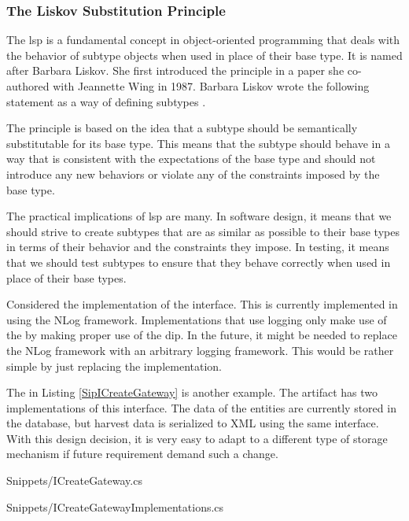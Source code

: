\subsubsection{The Liskov Substitution Principle} \label{subsubsec:lsp}


The \gls{lsp} is a fundamental concept in object-oriented programming that deals with the
behavior of subtype objects when used in place of their base type. It is named after
Barbara Liskov. She first introduced the principle in a paper she co-authored with
Jeannette Wing in 1987. Barbara Liskov wrote the following statement as a way of defining
subtypes \parencite{robert_c_martin_clean_2018}.


The principle is based on the idea that a subtype should be semantically substitutable for
its base type. This means that the subtype should behave in a way that is consistent with
the expectations of the base type and should not introduce any new behaviors or violate
any of the constraints imposed by the base type.

The practical implications of \gls{lsp} are many. In software design, it means that we
should strive to create subtypes that are as similar as possible to their base types in
terms of their behavior and the constraints they impose. In testing, it means that we
should test subtypes to ensure that they behave correctly when used in place of their base
types.

Considered the implementation of the  interface. This is
currently implemented in  using the NLog framework.
Implementations that use logging only make use of the  by making
proper use of the \acrlong{dip}. In the future, it might be needed to replace the NLog
framework with an arbitrary logging framework. This would be rather simple by just
replacing the  implementation.

The  in Listing \ref{SipICreateGateway} is another
example. The artifact has two implementations of this interface. The data of the entities
are currently stored in the database, but harvest data is serialized to XML using the same
 interface. With this design decision, it is very easy to adapt
to a different type of storage mechanism if future requirement demand such a change.


    {Snippets/ICreateGateway.cs}


    {Snippets/ICreateGatewayImplementations.cs}